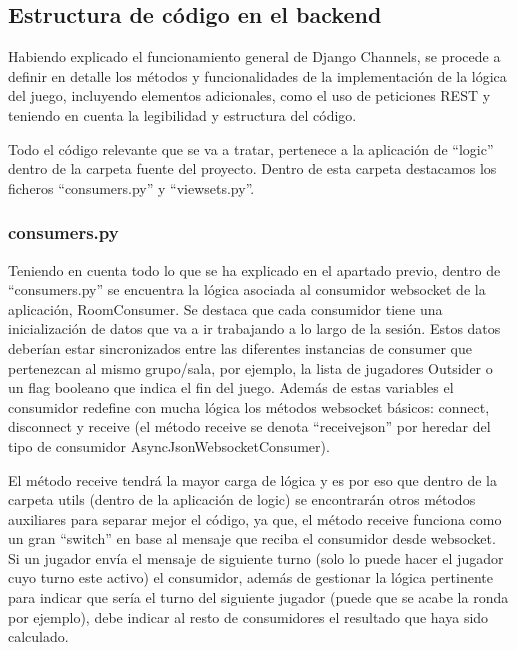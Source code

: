 \subsection{Estructura de código en el backend}

Habiendo explicado el funcionamiento general de Django Channels, se procede a definir en detalle los métodos y funcionalidades 
de la implementación de la lógica del juego, incluyendo elementos adicionales, como el uso de peticiones REST y teniendo en cuenta 
la legibilidad y estructura del código.

Todo el código relevante que se va a tratar, pertenece a la aplicación de ``logic'' dentro de la carpeta fuente del proyecto.
Dentro de esta carpeta destacamos los ficheros ``consumers.py'' y ``viewsets.py''.

\subsubsection{consumers.py}
Teniendo en cuenta todo lo que se ha explicado en el apartado previo, dentro de ``consumers.py'' se encuentra la lógica asociada
al consumidor websocket de la aplicación, RoomConsumer. Se destaca que cada consumidor tiene una inicialización de datos que va a ir trabajando
a lo largo de la sesión. Estos datos deberían estar sincronizados entre las diferentes instancias de consumer que pertenezcan 
al mismo grupo/sala, por ejemplo, la lista de jugadores Outsider o un flag booleano que indica el fin del juego. Además de estas variables el consumidor 
redefine con mucha lógica los métodos websocket básicos: connect, disconnect y receive (el método receive se denota ``receive\textunderscore json'' por heredar del tipo de consumidor 
AsyncJsonWebsocketConsumer).

El método receive tendrá la mayor carga de lógica y es por eso que dentro de la carpeta utils (dentro de la aplicación de logic) se encontrarán
otros métodos auxiliares para separar mejor el código, ya que, el método receive funciona como un gran ``switch'' en base al mensaje que reciba el
consumidor desde websocket. Si un jugador envía el mensaje de siguiente turno (solo lo puede hacer el jugador cuyo turno este activo) el consumidor, 
además de gestionar la lógica pertinente para indicar que sería el turno del siguiente jugador (puede que se acabe la ronda por ejemplo), debe indicar
al resto de consumidores el resultado que haya sido calculado.

